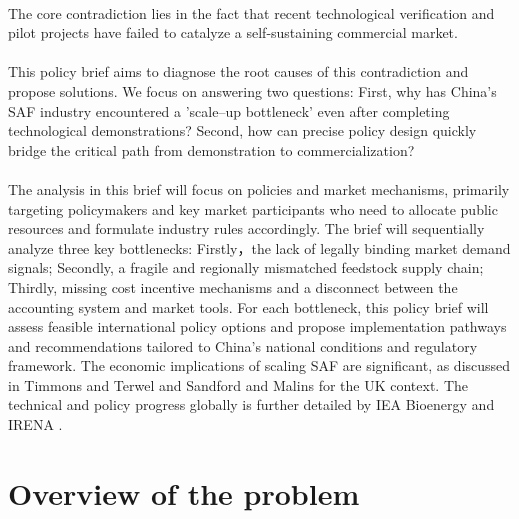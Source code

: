 \documentclass[a4paper,11pt]{article}
\begin{document}
\\
The core contradiction lies in the fact that recent technological verification and pilot projects have failed to catalyze a self-sustaining commercial market.\\
\\
This policy brief aims to diagnose the root causes of this contradiction and propose solutions. We focus on answering two questions: First, why has China's SAF industry encountered a 'scale--up bottleneck' even after completing technological demonstrations? Second, how can precise policy design quickly bridge the critical path from demonstration to commercialization?\\
\\
The analysis in this brief will focus on policies and market mechanisms, primarily targeting policymakers and key market participants who need to allocate public resources and formulate industry rules accordingly. The brief will sequentially analyze three key bottlenecks: Firstly，the lack of legally binding market demand signals; Secondly, a fragile and regionally mismatched feedstock supply chain; Thirdly, missing cost incentive mechanisms and a disconnect between the accounting system and market tools. For each bottleneck, this policy brief will assess feasible international policy options and propose implementation pathways and recommendations tailored to China's national conditions and regulatory framework. The economic implications of scaling SAF are significant, as discussed in Timmons and Terwel \cite{timmons2022} and Sandford and Malins \cite{sandford2024} for the UK context. The technical and policy progress globally is further detailed by IEA Bioenergy \cite{iea2024} and IRENA \cite{irena2024}.

\section{Overview of the problem}
\end{document}
